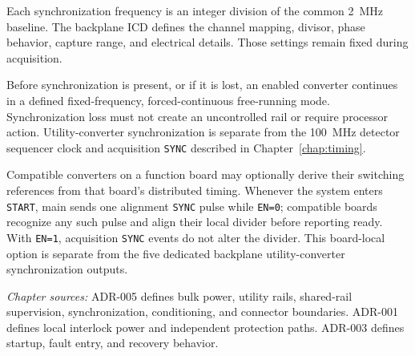 Each synchronization frequency is an integer division of the common 2~MHz baseline. The backplane ICD defines the channel mapping, divisor, phase behavior, capture range, and electrical details. Those settings remain fixed during acquisition.

Before synchronization is present, or if it is lost, an enabled converter continues in a defined fixed-frequency, forced-continuous free-running mode. Synchronization loss must not create an uncontrolled rail or require processor action. Utility-converter synchronization is separate from the 100~MHz detector sequencer clock and acquisition \texttt{SYNC} described in Chapter~\ref{chap:timing}.

Compatible converters on a function board may optionally derive their switching references from that board's distributed timing. Whenever the system enters \texttt{START}, main sends one alignment \texttt{SYNC} pulse while \texttt{EN=0}; compatible boards recognize any such pulse and align their local divider before reporting ready. With \texttt{EN=1}, acquisition \texttt{SYNC} events do not alter the divider. This board-local option is separate from the five dedicated backplane utility-converter synchronization outputs.

\medskip
\noindent\textit{Chapter sources:} ADR-005 defines bulk power, utility rails, shared-rail supervision, synchronization, conditioning, and connector boundaries. ADR-001 defines local interlock power and independent protection paths. ADR-003 defines startup, fault entry, and recovery behavior.

